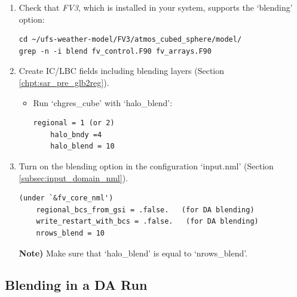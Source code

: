 \documentclass[11pt,fleqn]{report}              %
\begin{document}
\begin{enumerate}

\item Check that {\it FV3}, which is installed in your system, supports the `blending' option:
\lstset{language=bash}   
\begin{lstlisting}[frame=trBL]
cd ~/ufs-weather-model/FV3/atmos_cubed_sphere/model/
grep -n -i blend fv_control.F90 fv_arrays.F90
\end{lstlisting}

\item Create IC/LBC fields including blending layers (Section \ref{chpt:sar_pre_glb2reg}).
\begin{itemize}
\item Run `chgres\_cube' with `halo\_blend':
\lstset{language=bash}   
\begin{lstlisting}[frame=trBL]
    regional = 1 (or 2)
    halo_bndy =4
    halo_blend = 10
\end{lstlisting}
\end{itemize}

\item Turn on the blending option in the configuration `input.nml' (Section \ref{subsec:input_domain_nml}).

\lstset{language=bash}   
\begin{lstlisting}[frame=trBL]
(under `&fv_core_nml')
    regional_bcs_from_gsi = .false.   (for DA blending)
    write_restart_with_bcs = .false.   (for DA blending)
    nrows_blend = 10
\end{lstlisting}
{\bf Note)} Make sure that `halo\_blend' is equal to `nrows\_blend'.

\end{enumerate}


\subsection{Blending in a DA Run}
\end{document}

